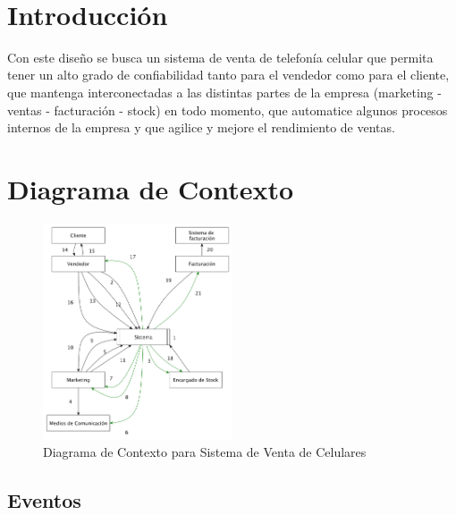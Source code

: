 ‌\section{Introducción}
Con este diseño se busca un sistema de venta de telefonía celular que permita tener un alto grado de confiabilidad tanto para el vendedor como para el cliente, que mantenga interconectadas a las distintas partes de la empresa (marketing - ventas - facturación - stock) en todo momento, que automatice algunos procesos internos de la empresa y que agilice y mejore el rendimiento de ventas.\\

\section{Diagrama de Contexto}

\begin{figure}[h!]
  \centering
  \includegraphics[width=0.5\textwidth]{./imagenes/contexto_1.pdf}
  \caption{Diagrama de Contexto para Sistema de Venta de Celulares}
\end{figure}

\subsection{Eventos}

